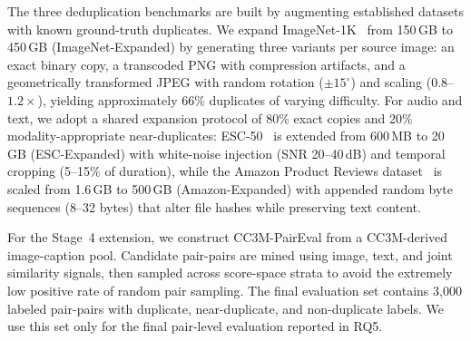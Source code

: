 \documentclass[conference]{IEEEtran}
\begin{document}
The three deduplication benchmarks are built by augmenting established datasets with known ground-truth duplicates. We expand ImageNet-1K~\cite{russakovsky2015imagenet} from 150\,GB to 450\,GB (ImageNet-Expanded) by generating three variants per source image: an exact binary copy, a transcoded PNG with compression artifacts, and a geometrically transformed JPEG with random rotation ($\pm15^{\circ}$) and scaling ($0.8$--$1.2\times$), yielding approximately 66\% duplicates of varying difficulty. For audio and text, we adopt a shared expansion protocol of 80\% exact copies and 20\% modality-appropriate near-duplicates: ESC-50~\cite{piczak2015esc} is extended from 600\,MB to 20\,GB (ESC-Expanded) with white-noise injection (SNR 20--40\,dB) and temporal cropping (5--15\% of duration), while the Amazon Product Reviews dataset~\cite{ni2019justifying} is scaled from 1.6\,GB to 500\,GB (Amazon-Expanded) with appended random byte sequences (8--32 bytes) that alter file hashes while preserving text content.

For the Stage~4 extension, we construct CC3M-PairEval from a CC3M-derived image-caption pool. Candidate pair-pairs are mined using image, text, and joint similarity signals, then sampled across score-space strata to avoid the extremely low positive rate of random pair sampling. The final evaluation set contains 3,000 labeled pair-pairs with duplicate, near-duplicate, and non-duplicate labels. We use this set only for the final pair-level evaluation reported in RQ5.
\end{document}
